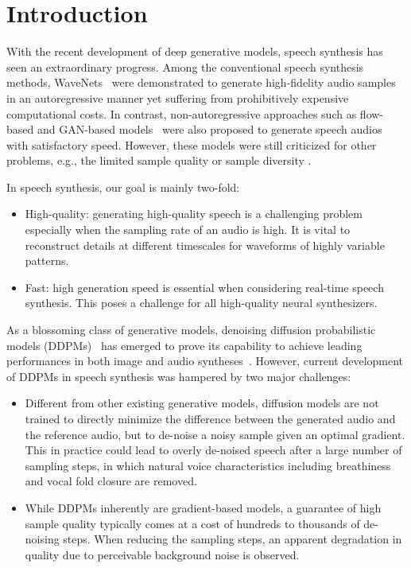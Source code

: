 \section{Introduction} \label{intro}


With the recent development of deep generative models, speech synthesis has seen an extraordinary progress. Among the conventional speech synthesis methods, WaveNets~\cite{oord2016wavenet} were demonstrated to generate high-fidelity audio samples in an autoregressive manner yet suffering from prohibitively expensive computational costs. In contrast, non-autoregressive approaches such as flow-based and GAN-based models~\cite{prenger2019waveglow,jang2021univnet,kong2020hifi,huang2021multi} were also proposed to generate speech audios with satisfactory speed. However, these models were still criticized for other problems, e.g., the limited sample quality or sample diversity \cite{xiao2021tackling}.

In speech synthesis, our goal is mainly two-fold:
\begin{itemize}
    \item High-quality: generating high-quality speech is a challenging problem especially when the sampling rate of an audio is high. It is vital to reconstruct details at different timescales for waveforms of highly variable patterns.
    \item Fast: high generation speed is essential when considering real-time speech synthesis. This poses a challenge for all high-quality neural synthesizers.
\end{itemize}

As a blossoming class of generative models, denoising diffusion probabilistic models (DDPMs)~\cite{ho2020denoising,song2020denoising,lam2022bddm,liu2022pseudo} has emerged to prove its capability to achieve leading performances in both image and audio syntheses~\cite{dhariwal2021diffusion,san2021noise,kong2020diffwave,chen2020wavegrad,lam2022bddm}. However, current development of DDPMs in speech synthesis was hampered by two major challenges:
\begin{itemize}
\item Different from other existing generative models, diffusion models are not trained to directly minimize the difference between the generated audio and the reference audio, but to de-noise a noisy sample given an optimal gradient. This in practice could lead to overly de-noised speech after a large number of sampling steps, in which natural voice characteristics including breathiness and vocal fold closure are removed.
\item While DDPMs inherently are gradient-based models, a guarantee of high sample quality typically comes at a cost of hundreds to thousands of de-noising steps. When reducing the sampling steps, an apparent degradation in quality due to perceivable background noise is observed.
\end{itemize}

